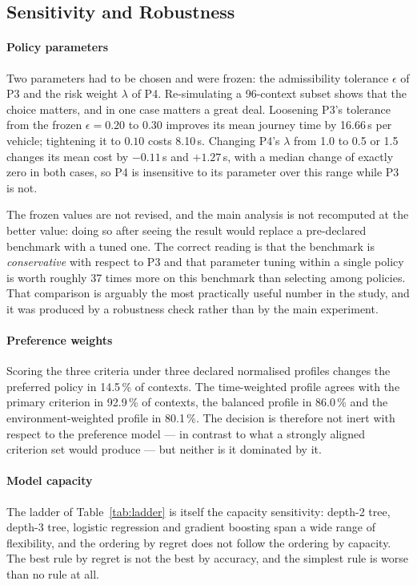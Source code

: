 \documentclass[preprint,12pt]{elsarticle}
\begin{document}
\subsection{Sensitivity and Robustness}
\label{sec:robust}

\paragraph{Policy parameters} Two parameters had to be chosen and were frozen:
the admissibility tolerance $\epsilon$ of P3 and the risk weight $\lambda$ of P4.
Re-simulating a 96-context subset shows that the choice matters, and in one case
matters a great deal. Loosening P3's tolerance from the frozen $\epsilon=0.20$ to
$0.30$ improves its mean journey time by 16.66\,s per vehicle; tightening it to
$0.10$ costs 8.10\,s. Changing P4's $\lambda$ from 1.0 to 0.5 or 1.5 changes its
mean cost by $-0.11$\,s and $+1.27$\,s, with a median change of exactly zero in
both cases, so P4 is insensitive to its parameter over this range while P3 is not.

The frozen values are not revised, and the main analysis is not recomputed at the
better value: doing so after seeing the result would replace a pre-declared
benchmark with a tuned one. The correct reading is that the benchmark is
\emph{conservative} with respect to P3 and that parameter tuning within a single
policy is worth roughly 37 times more on this benchmark than selecting among
policies. That comparison is arguably the most practically useful number in the
study, and it was produced by a robustness check rather than by the main
experiment.

\paragraph{Preference weights} Scoring the three criteria under three declared
normalised profiles changes the preferred policy in 14.5\,\% of contexts. The
time-weighted profile agrees with the primary criterion in 92.9\,\% of contexts,
the balanced profile in 86.0\,\% and the environment-weighted profile in 80.1\,\%.
The decision is therefore not inert with respect to the preference model --- in
contrast to what a strongly aligned criterion set would produce --- but neither is
it dominated by it.

\paragraph{Model capacity} The ladder of Table~\ref{tab:ladder} is itself the
capacity sensitivity: depth-2 tree, depth-3 tree, logistic regression and
gradient boosting span a wide range of flexibility, and the ordering by regret
does not follow the ordering by capacity. The best rule by regret is not the best
by accuracy, and the simplest rule is worse than no rule at all.
\end{document}

